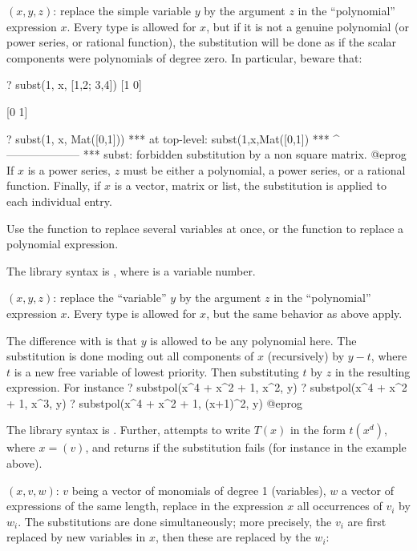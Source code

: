 $(x,y,z)$: \label{se:subst}replace the simple variable $y$ by the argument $z$ in the ``polynomial''
expression $x$. Every type is allowed for $x$, but if it is not a genuine
polynomial (or power series, or rational function), the substitution will be
done as if the scalar components were polynomials of degree zero. In
particular, beware that:

\bprog
? subst(1, x, [1,2; 3,4])
[1 0]

[0 1]

? subst(1, x, Mat([0,1]))
  ***   at top-level: subst(1,x,Mat([0,1])
  ***                 ^--------------------
  *** subst: forbidden substitution by a non square matrix.
@eprog\noindent
If $x$ is a power series, $z$ must be either a polynomial, a power
series, or a rational function. Finally, if $x$ is a vector,
matrix or list, the substitution is applied to each individual entry.

Use the function  to replace several variables at once,
or the function  to replace a polynomial expression.

The library syntax is , where  is a variable number.

$(x,y,z)$: \label{se:substpol}replace the ``variable'' $y$ by the argument $z$ in the ``polynomial''
expression $x$. Every type is allowed for $x$, but the same behavior
as  above apply.

The difference with  is that $y$ is allowed to be any polynomial
here. The substitution is done moding out all components of $x$
(recursively) by $y - t$, where $t$ is a new free variable of lowest
priority. Then substituting $t$ by $z$ in the resulting expression. For
instance
\bprog
? substpol(x^4 + x^2 + 1, x^2, y)
? substpol(x^4 + x^2 + 1, x^3, y)
? substpol(x^4 + x^2 + 1, (x+1)^2, y)
@eprog

The library syntax is .
Further,  attempts to
write $T(x)$ in the form $t(x^d)$, where $x=$$(v)$, and returns
 if the substitution fails (for instance in the example 
above).

$(x,v,w)$: \label{se:substvec}$v$ being a vector of monomials of degree 1 (variables),
$w$ a vector of expressions of the same length, replace in the expression
$x$ all occurrences of $v_i$ by $w_i$. The substitutions are done
simultaneously; more precisely, the $v_i$ are first replaced by new
variables in $x$, then these are replaced by the $w_i$:

